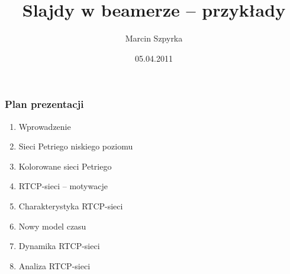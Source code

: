 \documentclass{beamer}
\title[Slajdy w beamerze]{Slajdy w beamerze -- przykłady}
\author[M. Szpyrka.]{Marcin Szpyrka}
\date[2011]{05.04.2011}
\institute[AGH-UST]
{Wydział EAIiE\\ 
Katedra Automatyki
}
\begin{document}
{
 \begin{frame}
   \titlepage
 \end{frame}
}


\begin{frame}
\frametitle{Plan prezentacji}

\begin{enumerate}
\item Wprowadzenie
\item Sieci Petriego niskiego poziomu
\item Kolorowane sieci Petriego
\item RTCP-sieci -- motywacje 
\pause
\item Charakterystyka RTCP-sieci
\item Nowy model czasu
\item Dynamika RTCP-sieci
\item Analiza RTCP-sieci
\end{enumerate}
\end{frame}

\end{document}
